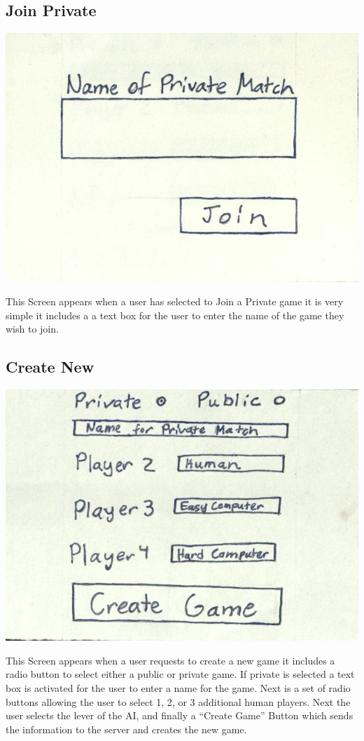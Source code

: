 \documentclass[]{scrartcl}
\begin{document}
\subsection{Join Private}
\centerline{\includegraphics{4.jpg}}
This Screen appears when a user has selected to Join a Private game it is very simple it includes a a text box for the user to enter the name of the game they wish to join. 

\subsection{Create New}
\centerline{\includegraphics{5.jpg}}
This Screen appears when a user requests to create a new game it includes a radio button to select either a public or private game.  If private is selected a text box is activated for the user to enter a name for the game.  Next is a set of radio buttons allowing the user to select 1, 2, or 3 additional human players.  Next the user selects the lever of the AI, and finally a “Create Game” Button which sends the information to the server and creates the new game.  
\end{document}
